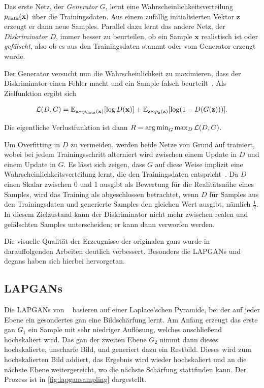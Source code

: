 Das erste Netz, der \emph{Generator} $ G $, lernt eine Wahrscheinlichkeitsverteilung $ p_{\textup{data}}(\mathbf{x}) $ über die Trainingsdaten.
Aus einem zufällig initialisierten Vektor $ \mathbf{z} $ erzeugt er dann neue Samples.
Parallel dazu lernt das andere Netz, der \emph{Diskriminator} $ D $, immer besser zu beurteilen, ob ein Sample $ \mathbf{x} $ realistisch ist oder \emph{gefälscht}, also ob es aus den Trainingsdaten stammt oder vom Generator erzeugt wurde.

Der Generator versucht nun die Wahrscheinlichkeit zu maximieren, dass der Diskriminator einen Fehler macht und ein Sample falsch beurteilt~\cite{Goodfellow.2014}.
Als Zielfunktion ergibt sich

\begin{equation}\label{eq:gan}
\mathcal{L}(D, G) = \mathbb{E}_{\mathbf{x} \sim p_{\textup{data}}(\mathbf{x})} [\log D(\mathbf{x})] + \mathbb{E}_{\mathbf{z} \sim p_{\mathbf{z}}(\mathbf{z})} [\log(1 - D(G(\mathbf{z})))].
\end{equation}

Die eigentliche Verlustfunktion ist dann $ R = \argmin_G \max_D\mathcal{L}(D, G)  $.

Um Overfitting in $ D $ zu vermeiden, werden beide Netze von Grund auf trainiert, wobei bei jedem Trainingsschritt alterniert wird zwischen einem Update in $ D $ und einem Update in $ G $.
Es lässt sich zeigen, dass $ G $ auf diese Weise implizit eine Wahrscheinlichkeitsverteilung lernt, die den Trainingsdaten entspricht~\cite{Goodfellow.2014}.
Da $ D $ einen Skalar zwischen 0 und 1 ausgibt als Bewertung für die Realitätsnähe eines Samples, wird das Training als abgeschlossen betrachtet, wenn $ D $ für Samples aus den Trainingsdaten und generierte Samples den gleichen Wert ausgibt, nämlich $ \frac{1}{2} $.
In diesem Zielzustand kann der Diskriminator nicht mehr zwischen realen und gefälschten Samples unterscheiden; er kann dann verworfen werden.

Die visuelle Qualität der Erzeugnisse der originalen \glspl{gan} wurde in darauffolgenden Arbeiten deutlich verbessert.
Besonders die LAPGANs und \glspl{dcgan} haben sich hierbei hervorgetan.



\subsection{LAPGANs}

Die LAPGANs von \citeauthor{Denton.2015}~\cite{Denton.2015} basieren auf einer Laplace'schen Pyramide, bei der auf jeder Ebene ein gesondertes \gls{gan} eine Bildschärfung lernt.
Am Anfang erzeugt das erste \gls{gan} $ G_1 $ ein Sample mit sehr niedriger Auflösung, welches anschließend hochskaliert wird.
Das \gls{gan} der zweiten Ebene $ G_2 $ nimmt dann dieses hochskalierte, unscharfe Bild, und generiert dazu ein Restbild.
Dieses wird zum hochskalierten Bild addiert, das Ergebnis wird wieder hochskaliert und an die nächste Ebene weitergereicht, wo die nächste Schärfung stattfinden kann.
Der Prozess ist in \autoref{fig:lapgansampling} dargestellt.

